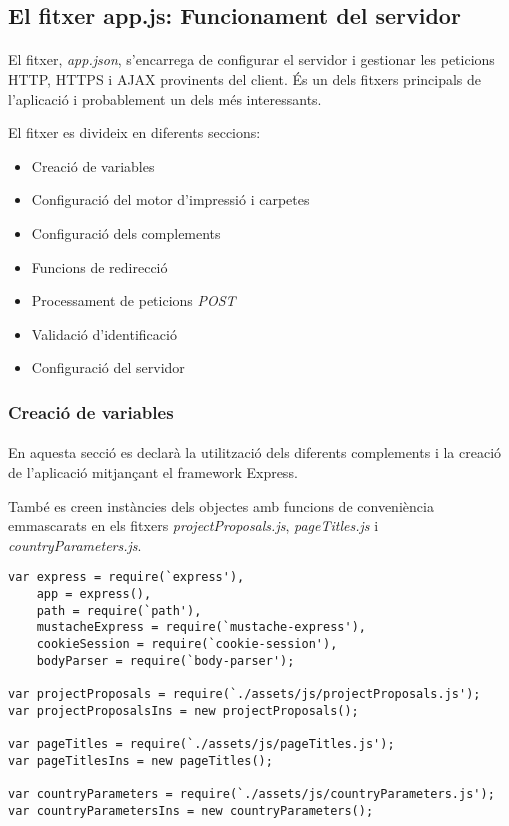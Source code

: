 \subsection{El fitxer app.js: Funcionament del servidor}

    \paragraph{}
    El fitxer, \emph{app.json}, s'encarrega de configurar el servidor i gestionar les peticions HTTP, HTTPS i AJAX provinents del client. És un dels fitxers principals de l'aplicació i probablement un dels més interessants.

    El fitxer es divideix en diferents seccions:

    \begin{itemize}
        \item Creació de variables
        \item Configuració del motor d'impressió i carpetes
        \item Configuració dels complements
        \item Funcions de redirecció
        \item Processament de peticions \emph{POST}
        \item Validació d'identificació
        \item Configuració del servidor
    \end{itemize}


    \subsubsection{Creació de variables}

    \paragraph{}
    En aquesta secció es declarà la utilització dels diferents complements i la creació de l'aplicació mitjançant el framework Express.

    També es creen instàncies dels objectes amb funcions de conveniència emmascarats en els fitxers \emph{projectProposals.js}, \emph{pageTitles.js} i \emph{countryParameters.js}.

    \begin{lstlisting}[style=rawOwn,caption={Declaració de variables en el servidor}]
var express = require(`express'),
    app = express(),
    path = require(`path'),
    mustacheExpress = require(`mustache-express'),
    cookieSession = require(`cookie-session'),
    bodyParser = require(`body-parser');

var projectProposals = require(`./assets/js/projectProposals.js');
var projectProposalsIns = new projectProposals();

var pageTitles = require(`./assets/js/pageTitles.js');
var pageTitlesIns = new pageTitles();

var countryParameters = require(`./assets/js/countryParameters.js');
var countryParametersIns = new countryParameters();
    \end{lstlisting}


